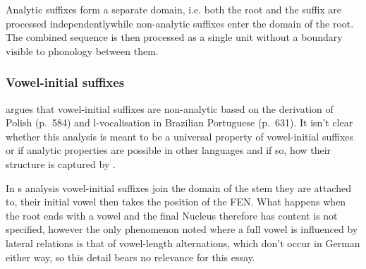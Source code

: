 Analytic suffixes form a separate domain, i.e. both the root and the
suffix are processed independently\co while non-analytic suffixes
enter the domain of the root. The combined sequence is then processed
as a single unit without a boundary visible to phonology between them.


\subsubsection{Vowel-initial suffixes}
\Textcite{scheer2004} argues that vowel-initial suffixes are non-analytic
based on the derivation of Polish  (p.~584) and
l-vocalisation in Brazilian Portuguese (p.~631).
It isn't clear whether this analysis is meant to be a universal
property of vowel-initial suffixes or if analytic properties are
possible in other languages and if so, how their structure is captured
by \CVCV\footnotemark.

In \citeauthor{scheer2004}s analysis vowel-initial suffixes join the domain
of the stem they are attached to,
their initial vowel then takes the position of the \gls{FEN}.
What happens when the root ends with a vowel and the final Nucleus therefore has
content is not specified, however the only phenomenon noted where a full vowel is
influenced by lateral relations is that of vowel-length alternations, which don't
occur in German either way, so this detail bears no relevance for this essay.

